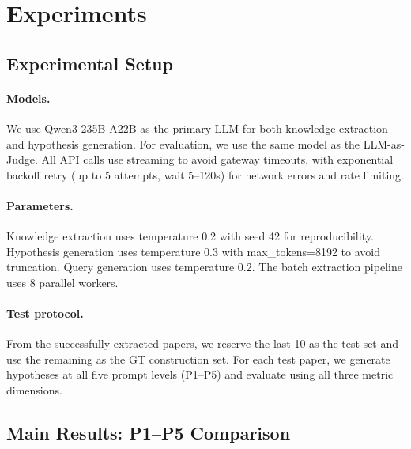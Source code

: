 \documentclass{article}
\begin{document}
\section{Experiments}
\label{sec:experiments}

\subsection{Experimental Setup}
\label{sec:setup}

\paragraph{Models.}
We use Qwen3-235B-A22B as the primary LLM for both knowledge extraction and hypothesis generation.
For evaluation, we use the same model as the LLM-as-Judge.
All API calls use streaming to avoid gateway timeouts, with exponential backoff retry (up to 5 attempts, wait 5--120s) for network errors and rate limiting.

\paragraph{Parameters.}
Knowledge extraction uses temperature 0.2 with seed 42 for reproducibility.
Hypothesis generation uses temperature 0.3 with max\_tokens=8192 to avoid truncation.
Query generation uses temperature 0.2.
The batch extraction pipeline uses 8 parallel workers.

\paragraph{Test protocol.}
From the successfully extracted papers, we reserve the last 10 as the test set and use the remaining as the GT construction set.
For each test paper, we generate hypotheses at all five prompt levels (P1--P5) and evaluate using all three metric dimensions.

\subsection{Main Results: P1--P5 Comparison}
\label{sec:main_results}
\end{document}
